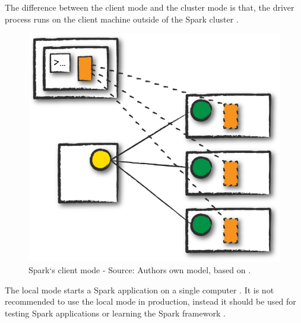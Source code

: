 The difference between the client mode and the cluster mode is that, the driver process runs on the client machine outside of the Spark cluster \cite{Chambers2018Spark}.
\begin{figure}[h]%
\centering
\includegraphics[scale=0.5]{images/03_background/client_mode}%
\caption{Spark`s client mode - Source: Authors own model, based on \cite{Chambers2018Spark}.}%
\label{fig:spark_client_mode}%
\end{figure}

The local mode starts a Spark application on a single computer \cite{Chambers2018Spark}. It is not recommended to use the local mode in production, instead it should be used for testing Spark applications or learning the Spark framework \cite{Chambers2018Spark}.


